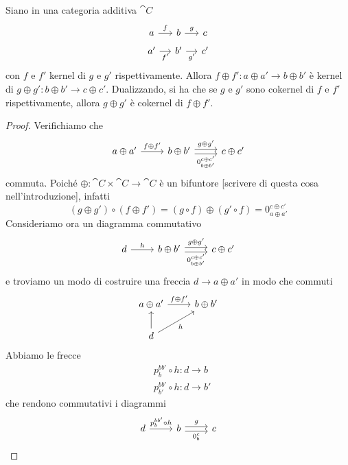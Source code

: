 \begin{lemma}\label{lemma:KerCokerOplus}
  Siano in una categoria additiva \(\cat C\)
  \[
    \begin{tikzcd}[row sep=tiny, column sep=small]
      a \ar["{f}", r] & b \ar["{g}", r] & c \\
      a' \ar["{f'}", r, swap] & b' \ar["{g'}", r, swap] & c'
    \end{tikzcd}
  \]
  con \(f\) e \(f'\) kernel di \(g\) e \(g'\) rispettivamente.  Allora
  \(f \oplus f' : a \oplus a' \to b \oplus b'\) è kernel di
  \(g \oplus g' : b \oplus b' \to c \oplus c'\). Dualizzando, si ha che se
  \(g\) e \(g'\) sono cokernel di \(f\) e \(f'\) rispettivamente,
  allora \(g \oplus g'\) è cokernel di \(f \oplus f'\).
\end{lemma}

\begin{proof}
  Verifichiamo che
  \[
    \begin{tikzcd}
      a \oplus a' \ar["{f \oplus f'}", r] & b \oplus b' \ar["{g \oplus g'}", r, shift
      left] \ar["{0_{b \oplus b'}^{c \oplus c'}}", r, shift right, swap] & c \oplus
      c'
    \end{tikzcd}
  \]
  commuta. Poiché \(\oplus : \cat C \times \cat C \to \cat C\) è un bifuntore
  {\color{red} [scrivere di questa cosa nell'introduzione]}, infatti
  \[
    (g \oplus g') \circ (f \oplus f') = (g \circ f) \oplus (g' \circ f) = 0_{a \oplus a'}^{c \oplus c'}
  \]
  Consideriamo ora un diagramma commutativo
  \[
    \begin{tikzcd}
      d \ar["{h}", r] & b \oplus b' \ar["{g \oplus g'}", r, shift left]
      \ar["{0_{b \oplus b'}^{c \oplus c'}}", r, shift right, swap] & c \oplus c'
    \end{tikzcd}
  \]
  e troviamo un modo di costruire una freccia \(d \to a \oplus a'\) in modo
  che commuti
  \[
    \begin{tikzcd}
      a \oplus a' \ar["{f \oplus f'}", r] & b \oplus b' \\
      d \ar["{h}", ur, swap] \ar["{}", u]
    \end{tikzcd}
  \]
  Abbiamo le frecce
  \begin{align*}
    & p_b^{bb'} \circ h : d \to b \\
    & p_{b'}^{bb'}\circ h : d \to b '
  \end{align*}
  che rendono commutativi i diagrammi
  \[
    \begin{tikzcd}
      d \ar["{p_b^{bb'} \circ h}", r] & b \ar["{g}", r, shift left]
      \ar["{0_b^c}", r, shift right, swap] & c

\end{tikzcd}\]
\end{proof}
